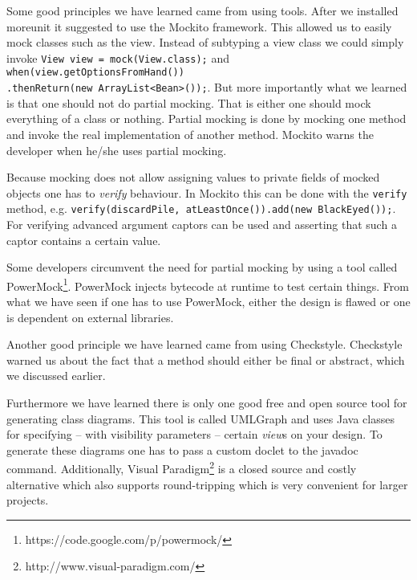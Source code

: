 Some good principles we have learned came from using tools. After we installed moreunit it suggested to use the Mockito framework. This
allowed us to easily mock classes such as the view. Instead of subtyping a view class we could simply invoke \texttt{View view =
mock(View.class);} and \texttt{when(view.getOptionsFromHand())} \\ \texttt{.thenReturn(new ArrayList<Bean>());}. But more importantly what
we learned is that one should not do partial mocking. That is either one should mock everything of a class or nothing. Partial mocking is
done by mocking one method and invoke the real implementation of another method. Mockito warns the developer when he/she uses partial
mocking.

Because mocking does not allow assigning values to private fields of mocked objects one has to \emph{verify} behaviour. In Mockito
this can be done with the \texttt{verify} method, e.g. \texttt{verify(discardPile, atLeastOnce()).add(new BlackEyed());}. For verifying
advanced argument captors can be used and asserting that such a captor contains a certain value. 

Some developers circumvent the need for
partial mocking by using a tool called PowerMock\footnote{https://code.google.com/p/powermock/}. PowerMock injects bytecode at runtime to
test certain things. From what we have seen if one has to use PowerMock, either the design is flawed or one is dependent on external
libraries.

Another good principle we have learned came from using Checkstyle. Checkstyle warned us about the fact that a method should either be final
or abstract, which we discussed earlier.

Furthermore we have learned there is only one good free and open source tool for generating class diagrams. This tool is called UMLGraph and
uses Java classes for specifying -- with visibility parameters -- certain \emph{view}s on your design. To generate these diagrams one has to
pass a custom doclet to the javadoc command. Additionally, Visual Paradigm\footnote{http://www.visual-paradigm.com/} is a closed source and
costly alternative which also supports round-tripping which is very convenient for larger projects.
